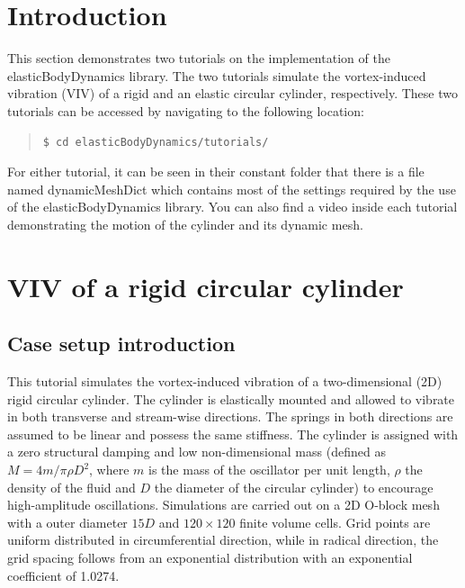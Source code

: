 \label{sec:EBD-demonstration}

\section{Introduction}

This section demonstrates two tutorials on the implementation of the elasticBodyDynamics library. The two tutorials simulate the vortex-induced vibration (VIV) of a rigid and an elastic circular cylinder, respectively. These two tutorials can be accessed by navigating to the following location:

\begin{quote}
\begin{verbatim}
$ cd elasticBodyDynamics/tutorials/
\end{verbatim}
\end{quote}

\noindent For either tutorial, it can be seen in their constant folder that there is a file named dynamicMeshDict which contains most of the settings required by the use of the elasticBodyDynamics library. You can also find a video inside each tutorial demonstrating the motion of the cylinder and its dynamic mesh.


\section{VIV of a rigid circular cylinder}

\subsection{Case setup introduction}

This tutorial simulates the vortex-induced vibration of a two-dimensional (2D) rigid circular cylinder. The cylinder is elastically mounted and allowed to vibrate in both transverse and stream-wise directions. The springs in both directions are assumed to be linear and possess the same stiffness. The cylinder is assigned with a zero structural damping and low non-dimensional mass (defined as $M=4m/\pi\rho D^2$, where $m$ is the mass of the oscillator per unit length, $\rho$ the density of the fluid and $D$ the diameter of the circular cylinder) to encourage high-amplitude oscillations. Simulations are carried out on a 2D O-block mesh with a outer diameter $15D$ and $120\times120$ finite volume cells. Grid points are uniform distributed in circumferential direction, while in radical direction, the grid spacing follows from an exponential distribution with an exponential coefficient of 1.0274.

